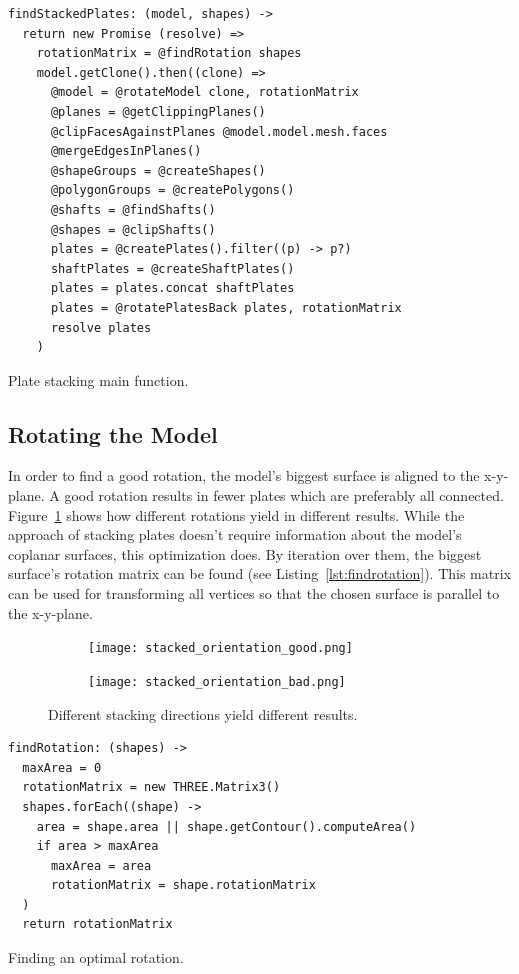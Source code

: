 \documentclass[../ClassicThesis.tex]{subfiles}
\begin{document}
\begin{listing}
\begin{verbatim}
findStackedPlates: (model, shapes) ->
  return new Promise (resolve) =>
    rotationMatrix = @findRotation shapes
    model.getClone().then((clone) =>
      @model = @rotateModel clone, rotationMatrix
      @planes = @getClippingPlanes()
      @clipFacesAgainstPlanes @model.model.mesh.faces
      @mergeEdgesInPlanes()
      @shapeGroups = @createShapes()
      @polygonGroups = @createPolygons()
      @shafts = @findShafts()
      @shapes = @clipShafts()
      plates = @createPlates().filter((p) -> p?)
      shaftPlates = @createShaftPlates()
      plates = plates.concat shaftPlates
      plates = @rotatePlatesBack plates, rotationMatrix
      resolve plates
    )
\end{verbatim}
\caption{Plate stacking main function.}
\label{lst:stackedmain}
\end{listing}

\subsection{Rotating the Model}

In order to find a good rotation, the model's biggest surface is aligned to the x-y-plane. A good rotation results in fewer plates which are preferably all connected. Figure~\ref{fig:stackingorientations} shows how different rotations yield in different results. While the approach of stacking plates doesn't require information about the model's coplanar surfaces, this optimization does. By iteration over them, the biggest surface's rotation matrix can be found (see Listing~\ref{lst:findrotation}). This matrix can be used for transforming all vertices so that the chosen surface is parallel to the x-y-plane.

\begin{figure}
  \centering
  \begin{subfigure}[t]{0.4\textwidth}
    \centering
    \texttt{[image: stacked\_orientation\_good.png]}
  \end{subfigure}
  \begin{subfigure}[t]{0.4\textwidth}
    \centering
    \texttt{[image: stacked\_orientation\_bad.png]}
  \end{subfigure}
  \caption{Different stacking directions yield different results.}
  \label{fig:stackingorientations}
\end{figure}

\begin{listing}
\begin{verbatim}
findRotation: (shapes) ->
  maxArea = 0
  rotationMatrix = new THREE.Matrix3()
  shapes.forEach((shape) ->
    area = shape.area || shape.getContour().computeArea()
    if area > maxArea
      maxArea = area
      rotationMatrix = shape.rotationMatrix
  )
  return rotationMatrix
\end{verbatim}
\caption{Finding an optimal rotation.}
\label{lst:findrotation}
\end{listing}
\end{document}

